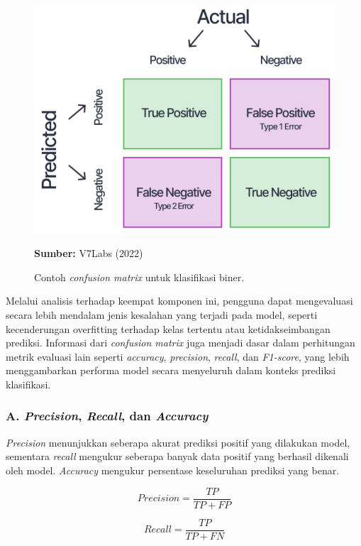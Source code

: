 \begin{figure}[H]
  \centering
  \includegraphics[scale=0.7]{gambar/bab2/cf.png}
  \caption{Contoh \emph{confusion matrix} untuk klasifikasi biner.}
  \label{fig:cf}
  \footnotesize{\textbf{Sumber:} V7Labs (2022)}
\end{figure}

Melalui analisis terhadap keempat komponen ini, pengguna dapat mengevaluasi secara lebih mendalam jenis kesalahan yang terjadi pada model, seperti kecenderungan overfitting terhadap kelas tertentu atau ketidakseimbangan prediksi. Informasi dari \emph{confusion matrix} juga menjadi dasar dalam perhitungan metrik evaluasi lain seperti \emph{accuracy}, \emph{precision}, \emph{recall}, dan \emph{F1-score}, yang lebih menggambarkan performa model secara menyeluruh dalam konteks prediksi klasifikasi.

\subsubsection{A. \emph{Precision}, \emph{Recall}, dan \emph{Accuracy}}

\emph{Precision} menunjukkan seberapa akurat prediksi positif yang dilakukan model, sementara \emph{recall} mengukur seberapa banyak data positif yang berhasil dikenali oleh model. \emph{Accuracy} mengukur persentase keseluruhan prediksi yang benar.

\begin{equation}
  Precision = \frac{TP}{TP + FP}
\end{equation}

\begin{equation}
  Recall = \frac{TP}{TP + FN}
\end{equation}

